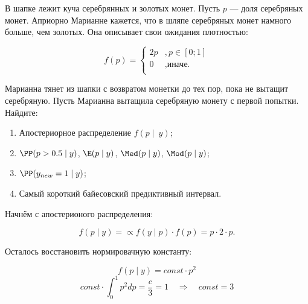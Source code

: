 


\begin{problem}\label{upr2}
В шапке лежит куча серебрянных и золотых монет. Пусть $p$ --- доля серебряных монет. Априорно Марианне кажется, что в шляпе серебряных монет намного больше, чем золотых. Она описывает свои ожидания плотностью: 

\[ f(p) = \begin{cases}
2p&, p \in [0;1] \\
0&, \text{иначе.}\\
\end{cases} \]

Марианна тянет из шапки с возвратом монетки до тех пор, пока не вытащит серебряную. Пусть Марианна вытащила серебряную монету с первой попытки. Найдите:

\begin{enumerate}
\item Апостериорное распределение $f(p \mid~y)$;
\item $\PP(p > 0.5 \mid y)$, $\E(p \mid y)$,  $\Med(p \mid y)$,  $\Mod(p \mid y)$;
\item  $\PP(y_{new} = 1 \mid y)$;
\item Самый короткий байесовский предиктивный интервал.
\end{enumerate}
	
\begin{sol}
 Начнём с апостерионого распределения:
			
\[ f(p \mid y) =  \propto  f(y \mid p) \cdot f(p)  =   p \cdot 2 \cdot p.\]

Осталось восстановить нормировачную константу:

\[ f(p \mid y) = const \cdot p^2 \]
\[ const \cdot \int_0^1 p^2 dp = \frac{c}{3} = 1 \quad \Rightarrow \quad const = 3 \]


\end{sol}
\end{problem}
